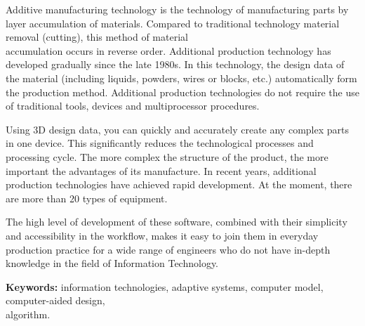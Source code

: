 Additive manufacturing technology is the technology of manufacturing
parts by layer accumulation of materials. Compared to traditional
technology material removal (cutting), this method of material\\
accumulation occurs in reverse order. Additional production technology
has developed gradually since the late 1980s. In this technology, the
design data of the material (including liquids, powders, wires or
blocks, etc.) automatically form the production method. Additional
production technologies do not require the use of traditional tools,
devices and multiprocessor procedures.

Using 3D design data, you can quickly and accurately create any complex
parts in one device. This significantly reduces the technological
processes and processing cycle. The more complex the structure of the
product, the more important the advantages of its manufacture. In recent
years, additional production technologies have achieved rapid
development. At the moment, there are more than 20 types of equipment.

The high level of development of these software, combined with their
simplicity and accessibility in the workflow, makes it easy to join them
in everyday production practice for a wide range of engineers who do not
have in-depth knowledge in the field of Information Technology.

\vspace{0.5em}
{\bfseries Keywords:} information technologies, adaptive systems, computer
model, computer-aided design, \\algorithm.

